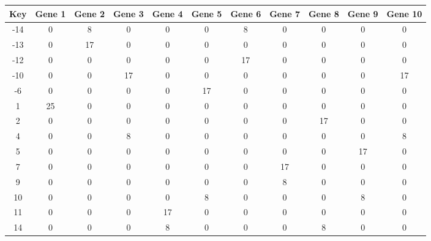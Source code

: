 \begin{tabular}{|c|c|c|c|c|c|c|c|c|c|c|}
\hline
Key & Gene 1 & Gene 2 & Gene 3 & Gene 4 & Gene 5 & Gene 6 & Gene 7 & Gene 8 & Gene 9 & Gene 10 \\
\hline
-14 & 0 & 8 & 0 & 0 & 0 & 8 & 0 & 0 & 0 & 0 \\
-13 & 0 & 17 & 0 & 0 & 0 & 0 & 0 & 0 & 0 & 0 \\
-12 & 0 & 0 & 0 & 0 & 0 & 17 & 0 & 0 & 0 & 0 \\
-10 & 0 & 0 & 17 & 0 & 0 & 0 & 0 & 0 & 0 & 17 \\
-6 & 0 & 0 & 0 & 0 & 17 & 0 & 0 & 0 & 0 & 0 \\
1 & 25 & 0 & 0 & 0 & 0 & 0 & 0 & 0 & 0 & 0 \\
2 & 0 & 0 & 0 & 0 & 0 & 0 & 0 & 17 & 0 & 0 \\
4 & 0 & 0 & 8 & 0 & 0 & 0 & 0 & 0 & 0 & 8 \\
5 & 0 & 0 & 0 & 0 & 0 & 0 & 0 & 0 & 17 & 0 \\
7 & 0 & 0 & 0 & 0 & 0 & 0 & 17 & 0 & 0 & 0 \\
9 & 0 & 0 & 0 & 0 & 0 & 0 & 8 & 0 & 0 & 0 \\
10 & 0 & 0 & 0 & 0 & 8 & 0 & 0 & 0 & 8 & 0 \\
11 & 0 & 0 & 0 & 17 & 0 & 0 & 0 & 0 & 0 & 0 \\
14 & 0 & 0 & 0 & 8 & 0 & 0 & 0 & 8 & 0 & 0 \\
\hline
\end{tabular}